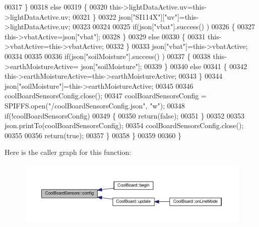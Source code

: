 \begin{DoxyCode}
00317             \}
00318             \textcolor{keywordflow}{else}
00319             \{
00320                 this->lightDataActive.uv=this->lightDataActive.uv;
00321             \}
00322             json[\textcolor{stringliteral}{"SI114X"}][\textcolor{stringliteral}{"uv"}]=this->lightDataActive.uv;
00323 
00324 
00325             \textcolor{keywordflow}{if}(json[\textcolor{stringliteral}{"vbat"}].success() )
00326             \{
00327                 this->vbatActive=json[\textcolor{stringliteral}{"vbat"}];
00328             \}
00329             \textcolor{keywordflow}{else}
00330             \{
00331                 this->vbatActive=this->vbatActive;
00332             \}
00333             json[\textcolor{stringliteral}{"vbat"}]=this->vbatActive;
00334 
00335             
00336             \textcolor{keywordflow}{if}(json[\textcolor{stringliteral}{"soilMoisture"}].success() )
00337             \{           
00338                 this->earthMoistureActive= json[\textcolor{stringliteral}{"soilMoisture"}];
00339             \}
00340             \textcolor{keywordflow}{else}
00341             \{
00342                 this->earthMoistureActive=this->earthMoistureActive;
00343             \}
00344             json[\textcolor{stringliteral}{"soilMoisture"}]=this->earthMoistureActive;
00345 
00346             coolBoardSensorsConfig.close();         
00347             coolBoardSensorsConfig = SPIFFS.open(\textcolor{stringliteral}{"/coolBoardSensorsConfig.json"}, \textcolor{stringliteral}{"w"});          
00348             \textcolor{keywordflow}{if}(!coolBoardSensorsConfig)
00349             \{
00350                 \textcolor{keywordflow}{return}(\textcolor{keyword}{false});          
00351             \}  
00352 
00353             json.printTo(coolBoardSensorsConfig);
00354             coolBoardSensorsConfig.close();         
00355             
00356               \textcolor{keywordflow}{return}(\textcolor{keyword}{true}); 
00357         \}
00358     \}   
00359 
00360 \}
\end{DoxyCode}
Here is the caller graph for this function\+:\nopagebreak
\begin{figure}[H]
\begin{center}
\leavevmode
\includegraphics[width=350pt]{class_cool_board_sensors_a9a218895c5423375c33c08f2c56fb23a_icgraph}
\end{center}
\end{figure}
\mbox{\label{class_cool_board_sensors_a4902b69f6e628bd6557193758fdd2bae}} 
